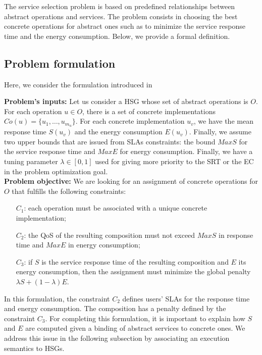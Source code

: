 \documentclass[a4paper]{article}
\begin{document}
The service selection problem is based on predefined relationships between abstract operations and services. 
The problem consists in choosing the best concrete operations for abstract ones such as 
to minimize the service response time and the energy consumption. Below, we provide a formal definition. 

\subsection{Problem formulation}

Here, we consider the formulation introduced in~\cite{JISA,cpe3015}

{\bf Problem's inputs: }
Let us consider a HSG whose set of abstract operations is $O$.  For each operation $u \in O$, 
there is a set of concrete implementations $Co(u) = \{u_1, \dots, u_{m_u}\}$. For each concrete 
implementation $u_v$, we have the mean response time $S(u_v)$ and the energy consumption $E(u_v)$. 
Finally, we assume two upper bounds that are issued from SLAs constraints: the bound $MaxS$ for 
the service response time and $MaxE$ for energy consumption. Finally, we have a tuning 
parameter $\lambda \in [0,1]$ used  for giving more priority to the SRT or the EC in the problem 
optimization goal.\\

{\bf Problem objective: }
We are looking for an assignment of concrete operations for $O$ that fulfills the following constraints:
\begin{enumerate}
\item[$C_1$:] each operation must be associated with a unique concrete implementation;
\item[$C_2$:] the QoS of the resulting composition must not exceed $MaxS$ in response time and  $MaxE$ in energy consumption;
\item[$C_3$:] if $S$ is the service response time of the resulting composition and $E$ its energy consumption, then 
the assignment must minimize the global penalty $\lambda S + (1-\lambda)E$. 
\end{enumerate}


In this formulation, the constraint $C_2$ defines users' SLAs for the response time and 
energy consumption. The composition has a penalty defined by the constraint $C_3$. 
For completing this formulation, it is important to explain how $S$ and $E$ are computed given 
a binding of abstract services to concrete ones. We address this issue in the following subsection by associating an 
execution semantics to HSGs. 
\end{document}
